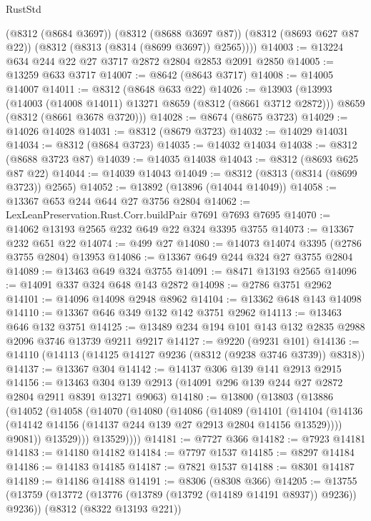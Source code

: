 \begin{lexlean}{RustStd}
\begin{coremodule}
        (@8312 (@8684 @3697))
        (@8312 (@8688 @3697 @87))
        (@8312 (@8693 @627 @87 @22))
        (@8312 (@8313 (@8314 (@8699 @3697)) @2565))))
@14003 := @13224 @634 @244 @22 @27 @3717 @2872 @2804 @2853 @2091 @2850
@14005 := @13259 @633 @3717
@14007 := @8642 (@8643 @3717)
@14008 := @14005 @14007
@14011 := @8312 (@8648 @633 @22)
@14026 := @13903
    (@13993
      (@14003 (@14008 @14011) @13271 @8659 (@8312 (@8661 @3712 @2872)))
      @8659
      (@8312 (@8661 @3678 @3720)))
@14028 := @8674 (@8675 @3723)
@14029 := @14026 @14028
@14031 := @8312 (@8679 @3723)
@14032 := @14029 @14031
@14034 := @8312 (@8684 @3723)
@14035 := @14032 @14034
@14038 := @8312 (@8688 @3723 @87)
@14039 := @14035 @14038
@14043 := @8312 (@8693 @625 @87 @22)
@14044 := @14039 @14043
@14049 := @8312 (@8313 (@8314 (@8699 @3723)) @2565)
@14052 := @13892 (@13896 (@14044 @14049))
@14058 := @13367 @653 @244 @644 @27 @3756 @2804
@14062 := LexLeanPreservation.Rust.Corr.buildPair @7691 @7693 @7695
@14070 := @14062 @13193 @2565 @232 @649 @22 @324 @3395 @3755
@14073 := @13367 @232 @651 @22
@14074 := @499 @27
@14080 := @14073 @14074 @3395 (@2786 @3755 @2804) @13953
@14086 := @13367 @649 @244 @324 @27 @3755 @2804
@14089 := @13463 @649 @324 @3755
@14091 := @8471 @13193 @2565
@14096 := @14091 @337 @324 @648 @143 @2872
@14098 := @2786 @3751 @2962
@14101 := @14096 @14098 @2948 @8962
@14104 := @13362 @648 @143 @14098
@14110 := @13367 @646 @349 @132 @142 @3751 @2962
@14113 := @13463 @646 @132 @3751
@14125 := @13489 @234 @194 @101 @143 @132 @2835 @2988 @2096 @3746 @13739 @9211 @9217
@14127 := @9220 (@9231 @101)
@14136 := @14110 (@14113 (@14125 @14127 @9236 (@8312 (@9238 @3746 @3739)) @8318))
@14137 := @13367 @304
@14142 := @14137 @306 @139 @141 @2913 @2915
@14156 := @13463 @304 @139 @2913 (@14091 @296 @139 @244 @27 @2872 @2804 @2911 @8391 @13271 @9063)
@14180 := @13800
    (@13803
      (@13886
        (@14052
          (@14058
            (@14070
              (@14080
                (@14086
                  (@14089
                    (@14101
                      (@14104
                        (@14136 (@14142 @14156 (@14137 @244 @139 @27 @2913 @2804 @14156 @13529))))
                      @9081))
                  @13529)))
            @13529))))
@14181 := @7727 @366
@14182 := @7923 @14181
@14183 := @14180 @14182
@14184 := @7797 @1537
@14185 := @8297 @14184
@14186 := @14183 @14185
@14187 := @7821 @1537
@14188 := @8301 @14187
@14189 := @14186 @14188
@14191 := @8306 (@8308 @366)
@14205 := @13755
    (@13759 (@13772 (@13776 (@13789 (@13792 (@14189 @14191 @8937)) @9236)) @9236))
    (@8312 (@8322 @13193 @221))

\end{coremodule}
\end{lexlean}
